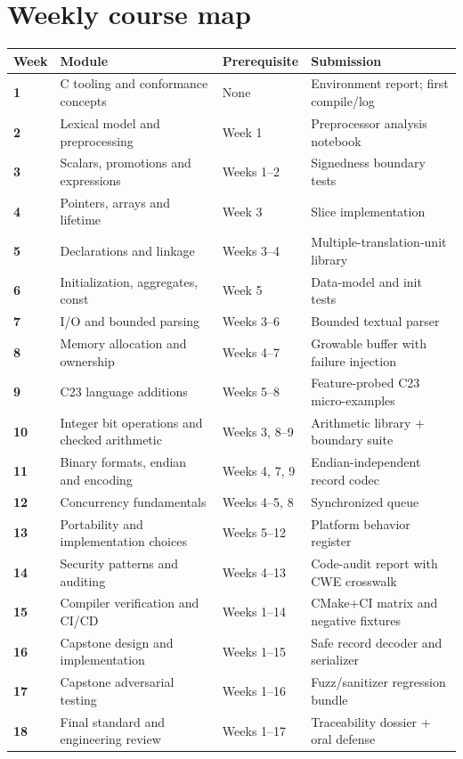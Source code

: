 \documentclass[10pt,letterpaper,oneside]{report}
\begin{document}
\section{Weekly course map}
\small\begin{longtable}{>{\raggedright\arraybackslash}p{.09\linewidth}>{\raggedright\arraybackslash}p{.33\linewidth}>{\raggedright\arraybackslash}p{.21\linewidth}>{\raggedright\arraybackslash}p{.26\linewidth}}\toprule Week & Module & Prerequisite & Submission\\\midrule\endhead
\textbf{1} & C tooling and conformance concepts & None & Environment report; first compile/log\\\hline
\textbf{2} & Lexical model and preprocessing & Week 1 & Preprocessor analysis notebook\\\hline
\textbf{3} & Scalars, promotions and expressions & Weeks 1--2 & Signedness boundary tests\\\hline
\textbf{4} & Pointers, arrays and lifetime & Week 3 & Slice implementation\\\hline
\textbf{5} & Declarations and linkage & Weeks 3--4 & Multiple-translation-unit library\\\hline
\textbf{6} & Initialization, aggregates, const & Week 5 & Data-model and init tests\\\hline
\textbf{7} & I/O and bounded parsing & Weeks 3--6 & Bounded textual parser\\\hline
\textbf{8} & Memory allocation and ownership & Weeks 4--7 & Growable buffer with failure injection\\\hline
\textbf{9} & C23 language additions & Weeks 5--8 & Feature-probed C23 micro-examples\\\hline
\textbf{10} & Integer bit operations and checked arithmetic & Weeks 3, 8--9 & Arithmetic library + boundary suite\\\hline
\textbf{11} & Binary formats, endian and encoding & Weeks 4, 7, 9 & Endian-independent record codec\\\hline
\textbf{12} & Concurrency fundamentals & Weeks 4--5, 8 & Synchronized queue\\\hline
\textbf{13} & Portability and implementation choices & Weeks 5--12 & Platform behavior register\\\hline
\textbf{14} & Security patterns and auditing & Weeks 4--13 & Code-audit report with CWE crosswalk\\\hline
\textbf{15} & Compiler verification and CI/CD & Weeks 1--14 & CMake+CI matrix and negative fixtures\\\hline
\textbf{16} & Capstone design and implementation & Weeks 1--15 & Safe record decoder and serializer\\\hline
\textbf{17} & Capstone adversarial testing & Weeks 1--16 & Fuzz/sanitizer regression bundle\\\hline
\textbf{18} & Final standard and engineering review & Weeks 1--17 & Traceability dossier + oral defense\\\hline
\bottomrule\end{longtable}\normalsize
\end{document}
